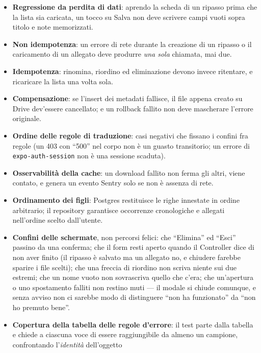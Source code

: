 \documentclass[11pt,a4paper]{report}
\begin{document}
\begin{itemize}[nosep]
  \item \textbf{Regressione da perdita di dati}: aprendo la scheda di un
        ripasso prima che la lista sia caricata, un tocco su Salva non deve
        scrivere campi vuoti sopra titolo e note memorizzati.
  \item \textbf{Non idempotenza}: un errore di rete durante la creazione di un
        ripasso o il caricamento di un allegato deve produrre \emph{una sola}
        chiamata, mai due.
  \item \textbf{Idempotenza}: rinomina, riordino ed eliminazione devono invece
        ritentare, e ricaricare la lista una volta sola.
  \item \textbf{Compensazione}: se l'insert dei metadati fallisce, il file
        appena creato su Drive dev'essere cancellato; e un rollback fallito
        non deve mascherare l'errore originale.
  \item \textbf{Ordine delle regole di traduzione}: casi negativi che fissano i
        confini fra regole (un 403 con ``500'' nel corpo non \`e un guasto
        transitorio; un errore di \texttt{expo-auth-session} non \`e una
        sessione scaduta).
  \item \textbf{Osservabilit\`a della cache}: un download fallito non ferma gli
        altri, viene contato, e genera un evento Sentry solo se non \`e
        assenza di rete.
  \item \textbf{Ordinamento dei figli}: Postgres restituisce le righe innestate
        in ordine arbitrario; il repository garantisce occorrenze cronologiche
        e allegati nell'ordine scelto dall'utente.
  \item \textbf{Confini delle schermate}, non percorsi felici: che ``Elimina''
        ed ``Esci'' passino da una conferma; che il form resti aperto quando il
        Controller dice di non aver finito (il ripasso \`e salvato ma un
        allegato no, e chiudere farebbe sparire i file scelti); che una freccia
        di riordino non scriva niente sui due estremi; che un nome vuoto non
        sovrascriva quello che c'era; che un'apertura o uno spostamento falliti
        non restino muti --- il modale si chiude comunque, e senza avviso non
        ci sarebbe modo di distinguere ``non ha funzionato'' da ``non ho
        premuto bene''.
  \item \textbf{Copertura della tabella delle regole d'errore}: il test parte
        dalla tabella e chiede a ciascuna voce di essere raggiungibile da
        almeno un campione, confrontando l'\emph{identit\`a} dell'oggetto

\end{itemize}
\end{document}
